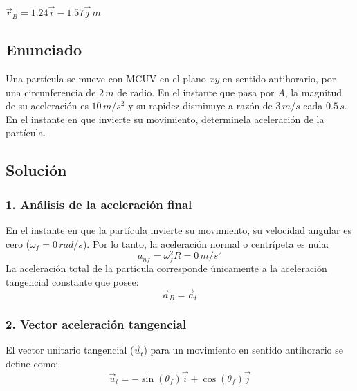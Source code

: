 \documentclass[12pt, a4paper]{article}
\begin{document}
\begin{tcolorbox}[colback=green!5!white, colframe=green!50!black, title=Respuesta Final]
\centering \Large $\vec{r}_B = 1.24\vec{i} - 1.57\vec{j} \, \si{m}$
\end{tcolorbox}

\newpage

\subsection*{Enunciado}
Una partícula se mueve con MCUV en el plano $xy$ en sentido antihorario, por una circunferencia de $2 \, \si{m}$ de radio. En el instante que pasa por $A$, la magnitud de su aceleración es $10 \, \si{m/s^2}$ y su rapidez disminuye a razón de $3 \, \si{m/s}$ cada $0.5 \, \si{s}$. En el instante en que invierte su movimiento, determinela aceleración de la partícula.

\begin{center}
\end{center}

\subsection*{Solución}

\subsubsection*{1. Análisis de la aceleración final}
En el instante en que la partícula invierte su movimiento, su velocidad angular es cero ($\omega_f = 0 \, \si{rad/s}$).
Por lo tanto, la aceleración normal o centrípeta es nula:
$$ a_{nf} = \omega_f^2 R = 0 \, \si{m/s^2} $$
La aceleración total de la partícula corresponde únicamente a la aceleración tangencial constante que posee:
$$ \vec{a}_B = \vec{a}_t $$

\subsubsection*{2. Vector aceleración tangencial}
El vector unitario tangencial ($\vec{u}_t$) para un movimiento en sentido antihorario se define como:
$$ \vec{u}_t = -\sin(\theta_f)\vec{i} + \cos(\theta_f)\vec{j} $$
\end{document}
